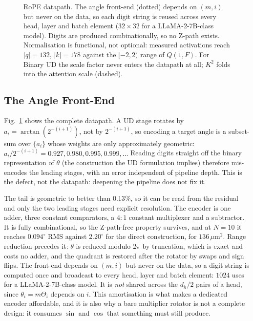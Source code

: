 \documentclass[conference]{IEEEtran}
\begin{document}
\begin{figure}[t]
\vspace{-4mm}
\caption{RoPE datapath. The angle front-end (dotted) depends on $(m,i)$ but
never on the data, so each digit string is reused across every head, layer and
batch element ($32\times32$ for a LLaMA-2-7B-class model). Digits are produced
combinationally, so no Z-path exists. Normalisation is functional, not
optional: measured activations reach $|q|=132$, $|k|=178$ against the $[-2,2)$
range of $Q(1,F)$. For Binary UD the scale factor never enters the datapath at
all; $K^{2}$ folds into the attention scale (dashed).}
\label{fig:arch}
\end{figure}

\subsection{The Angle Front-End}
\label{sec:encoder}

Fig.~\ref{fig:arch} shows the complete datapath. A UD stage rotates by
$a_i = \arctan(2^{-(i+1)})$, not by $2^{-(i+1)}$, so encoding a target angle is
a subset-sum over $\{a_i\}$ whose weights are only approximately geometric:
$a_i/2^{-(i+1)} = 0.927, 0.980, 0.995, 0.999,\ldots$ Reading digits straight
off the binary representation of $\theta$ (the construction the UD
formulation implies) therefore mis-encodes the leading stages, with an error
independent of pipeline depth. This is the defect, not the datapath: deepening
the pipeline does not fix it.

The tail is geometric to better than $0.13\%$, so it can be read from the
residual and only the two leading stages need explicit resolution. The encoder
is one adder, three constant comparators, a $4{:}1$ constant multiplexer and a
subtractor. It is fully combinational, so the Z-path-free property survives,
and at $N=10$ it reaches $0.094^{\circ}$ RMS against $2.20^{\circ}$ for the direct
construction, for $136$\,$\mu$m$^2$. Range reduction precedes it: $\theta$ is
reduced modulo $2\pi$ by truncation, which is exact and costs no adder, and the
quadrant is restored after the rotator by swaps and sign flips. The front-end
depends on $(m,i)$ but never on the data, so a digit string is computed once
and broadcast to every head, layer and batch element: $1024$ uses for a
LLaMA-2-7B-class model. It is \emph{not} shared across the $d_h/2$ pairs of a
head, since $\theta_i = m\Theta_i$ depends on $i$. This amortisation is what
makes a dedicated encoder affordable, and it is also why a bare multiplier
rotator is not a complete design: it consumes $\sin$ and $\cos$ that something
must still produce.
\end{document}
